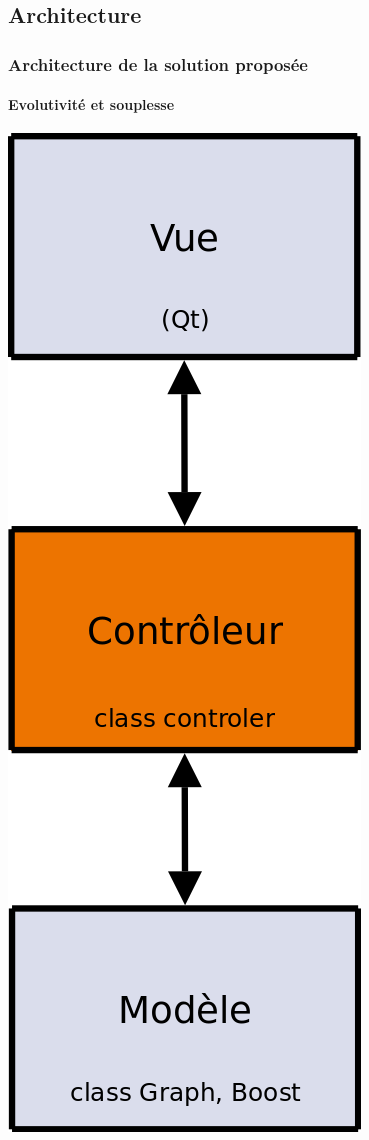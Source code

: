 \subsection{Architecture}
\frame
{
\frametitle{Architecture de la solution propos\'ee}
\framesubtitle{Evolutivité et souplesse}

\begin{minipage}{0.45\textwidth}
\begin{flushleft}
\begin{center}
\includegraphics[height=0.95\textheight]{mvcScheme.png}

\end{center}
\end{flushleft}
\end{minipage}}
